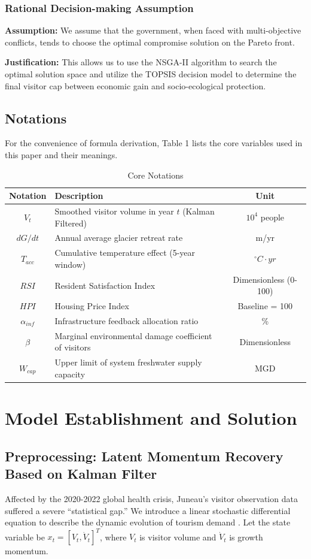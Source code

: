 \documentclass{mcmthesis}
\begin{document}
\subsubsection{Rational Decision-making Assumption}
\textbf{Assumption:} We assume that the government, when faced with multi-objective conflicts, tends to choose the optimal compromise solution on the Pareto front.

\textbf{Justification:} This allows us to use the NSGA-II algorithm to search the optimal solution space and utilize the TOPSIS decision model to determine the final visitor cap between economic gain and socio-ecological protection.

\subsection{Notations}
For the convenience of formula derivation, Table 1 lists the core variables used in this paper and their meanings.

\begin{table}[htbp]
\centering
\caption{Core Notations}
\begin{tabular}{c|l|c}
\toprule
Notation & Description & Unit \\
\midrule
$V_t$ & Smoothed visitor volume in year $t$ (Kalman Filtered) & $10^4$ people \\
$dG/dt$ & Annual average glacier retreat rate & m/yr \\
$T_{acc}$ & Cumulative temperature effect (5-year window) & $^\circ C \cdot yr$ \\
$RSI$ & Resident Satisfaction Index & Dimensionless (0-100) \\
$HPI$ & Housing Price Index & Baseline = 100 \\
$\alpha_{inf}$ & Infrastructure feedback allocation ratio & \% \\
$\beta$ & Marginal environmental damage coefficient of visitors & Dimensionless \\
$W_{cap}$ & Upper limit of system freshwater supply capacity & MGD \\
\bottomrule
\end{tabular}
\end{table}

\section{Model Establishment and Solution}

\subsection{Preprocessing: Latent Momentum Recovery Based on Kalman Filter}
Affected by the 2020-2022 global health crisis, Juneau's visitor observation data suffered a severe ``statistical gap.'' We introduce a linear stochastic differential equation to describe the dynamic evolution of tourism demand \cite{Kalman1960}. Let the state variable be $x_t = [V_t, \dot{V}_t]^T$, where $V_t$ is visitor volume and $\dot{V}_t$ is growth momentum.
\end{document}
